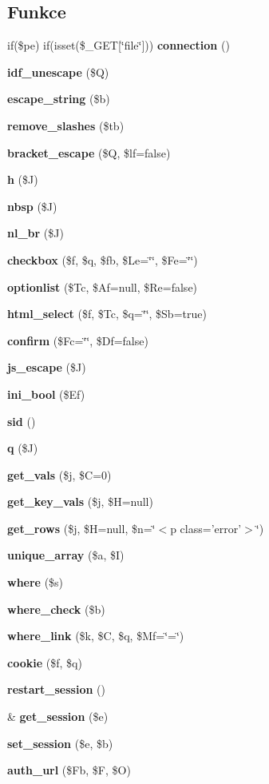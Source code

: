 \subsection*{Funkce}
\begin{DoxyCompactItemize}
\item 
if(\$pe) if(isset(\$\_\-GET[\char`\"{}file\char`\"{}])) {\bf connection} ()
\item 
{\bf idf\_\-unescape} (\$Q)
\item 
{\bf escape\_\-string} (\$b)
\item 
{\bf remove\_\-slashes} (\$tb)
\item 
{\bf bracket\_\-escape} (\$Q, \$lf=false)
\item 
{\bf h} (\$J)
\item 
{\bf nbsp} (\$J)
\item 
{\bf nl\_\-br} (\$J)
\item 
{\bf checkbox} (\$f, \$q, \$fb, \$Le=\char`\"{}\char`\"{}, \$Fe=\char`\"{}\char`\"{})
\item 
{\bf optionlist} (\$Tc, \$Af=null, \$Re=false)
\item 
{\bf html\_\-select} (\$f, \$Tc, \$q=\char`\"{}\char`\"{}, \$Sb=true)
\item 
{\bf confirm} (\$Fc=\char`\"{}\char`\"{}, \$Df=false)
\item 
{\bf js\_\-escape} (\$J)
\item 
{\bf ini\_\-bool} (\$Ef)
\item 
{\bf sid} ()
\item 
{\bf q} (\$J)
\item 
{\bf get\_\-vals} (\$j, \$C=0)
\item 
{\bf get\_\-key\_\-vals} (\$j, \$H=null)
\item 
{\bf get\_\-rows} (\$j, \$H=null, \$n=\char`\"{}$<$p class='error'$>$\char`\"{})
\item 
{\bf unique\_\-array} (\$a, \$I)
\item 
{\bf where} (\$s)
\item 
{\bf where\_\-check} (\$b)
\item 
{\bf where\_\-link} (\$k, \$C, \$q, \$Mf=\char`\"{}=\char`\"{})
\item 
{\bf cookie} (\$f, \$q)
\item 
{\bf restart\_\-session} ()
\item 
\& {\bf get\_\-session} (\$e)
\item 
{\bf set\_\-session} (\$e, \$b)
\item 
{\bf auth\_\-url} (\$Fb, \$F, \$O)

\end{DoxyCompactItemize}
